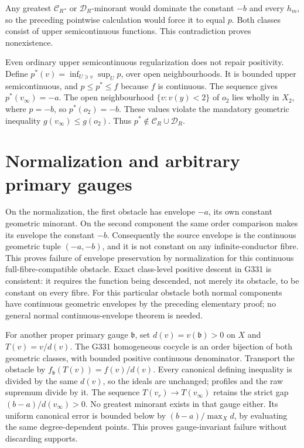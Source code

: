 \documentclass[11pt]{article}
\newcommand{\C}{\mathcal C}
\newcommand{\D}{\mathcal D}
\begin{document}
Any greatest \(\C_R\)- or \(\D_R\)-minorant would dominate
the constant \(-b\) and every \(h_m\), so the preceding pointwise
calculation would force it to equal \(p\). Both classes consist of
upper semicontinuous functions. This contradiction proves nonexistence.

Even ordinary upper semicontinuous regularization does not repair positivity.
Define \(p^*(v)=\inf_{U\ni v}\sup_U p\), over open neighbourhoods.
It is bounded upper semicontinuous, and \(p\leq p^*\leq f\) because
\(f\) is continuous. The sequence gives \(p^*(v_\infty)=-a\).
The open neighbourhood \(\{v:v(y)<2\}\) of \(o_2\) lies wholly in
\(X_2\), where \(p=-b\), so \(p^*(o_2)=-b\).
These values violate the mandatory geometric inequality
\(g(v_\infty)\leq g(o_2)\). Thus \(p^*\notin\C_R\cup\D_R\).

\section{Normalization and arbitrary primary gauges}

On the normalization, the first obstacle has envelope \(-a\), its
own constant geometric minorant. On the second component the same order
comparison makes its envelope the constant \(-b\).
Consequently the source envelope is the continuous geometric tuple
\((-a,-b)\), and it is not constant on any infinite-conductor fibre.
This proves failure of envelope preservation by normalization for this
continuous full-fibre-compatible obstacle. Exact class-level positive
descent in G331 is consistent: it requires the function being descended,
not merely its obstacle, to be constant on every fibre.
For this particular obstacle both normal components have continuous
geometric envelopes by the preceding elementary proof; no general normal
continuous-envelope theorem is needed.

For another proper primary gauge \(\mathfrak b\), set
\(d(v)=v(\mathfrak b)>0\) on \(X\) and \(T(v)=v/d(v)\).
The G331 homogeneous cocycle is an order bijection of both geometric
classes, with bounded positive continuous denominator. Transport the
obstacle by \(f_{\mathfrak b}(T(v))=f(v)/d(v)\).
Every canonical defining inequality is divided by the same \(d(v)\),
so the ideals are unchanged; profiles and the raw supremum divide by it.
The sequence \(T(v_r)\to T(v_\infty)\) retains the strict gap
\((b-a)/d(v_\infty)>0\). No greatest minorant exists in that gauge
either. Its uniform canonical error is bounded below by
\((b-a)/\max_X d\), by evaluating the same degree-dependent points.
This proves gauge-invariant failure without discarding supports.
\end{document}
